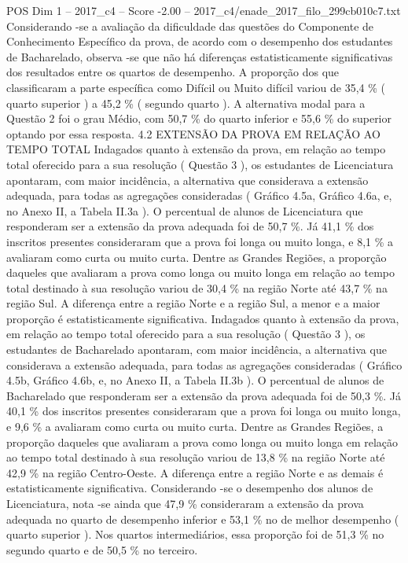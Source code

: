 \begin{textsample}{POS Dim 1 – 2017\_c4 – Score -2.00 – 2017\_c4/enade\_2017\_filo\_299cb010c7.txt}
Considerando -se a avaliação da dificuldade das questões do Componente de Conhecimento Específico da prova, de acordo com o desempenho dos estudantes de Bacharelado, observa -se que não há diferenças estatisticamente significativas dos resultados entre os quartos de desempenho.
A proporção dos que classificaram a parte específica como Difícil ou Muito difícil variou de 35,4 \% ( quarto superior ) a 45,2 \% ( segundo quarto ).
A alternativa modal para a Questão 2 foi o grau Médio, com 50,7 \% do quarto inferior e 55,6 \% do superior optando por essa resposta. 4.2 EXTENSÃO DA PROVA EM RELAÇÃO AO TEMPO TOTAL Indagados quanto à extensão da prova, em relação ao tempo total oferecido para a sua resolução ( Questão 3 ), os estudantes de Licenciatura apontaram, com maior incidência, a alternativa que considerava a extensão adequada, para todas as agregações consideradas ( Gráfico 4.5a, Gráfico 4.6a, e, no Anexo II, a Tabela II.3a ).
O percentual de alunos de Licenciatura que responderam ser a extensão da prova adequada foi de 50,7 \%.
Já 41,1 \% dos inscritos presentes consideraram que a prova foi longa ou muito longa, e 8,1 \% a avaliaram como curta ou muito curta.
Dentre as Grandes Regiões, a proporção daqueles que avaliaram a prova como longa ou muito longa em relação ao tempo total destinado à sua resolução variou de 30,4 \% na região Norte até 43,7 \% na região Sul.
A diferença entre a região Norte e a região Sul, a menor e a maior proporção é estatisticamente significativa.
Indagados quanto à extensão da prova, em relação ao tempo total oferecido para a sua resolução ( Questão 3 ), os estudantes de Bacharelado apontaram, com maior incidência, a alternativa que considerava a extensão adequada, para todas as agregações consideradas ( Gráfico 4.5b, Gráfico 4.6b, e, no Anexo II, a Tabela II.3b ).
O percentual de alunos de Bacharelado que responderam ser a extensão da prova adequada foi de 50,3 \%.
Já 40,1 \% dos inscritos presentes consideraram que a prova foi longa ou muito longa, e 9,6 \% a avaliaram como curta ou muito curta.
Dentre as Grandes Regiões, a proporção daqueles que avaliaram a prova como longa ou muito longa em relação ao tempo total destinado à sua resolução variou de 13,8 \% na região Norte até 42,9 \% na região Centro-Oeste.
A diferença entre a região Norte e as demais é estatisticamente significativa.
Considerando -se o desempenho dos alunos de Licenciatura, nota -se ainda que 47,9 \% consideraram a extensão da prova adequada no quarto de desempenho inferior e 53,1 \% no de melhor desempenho ( quarto superior ).
Nos quartos intermediários, essa proporção foi de 51,3 \% no segundo quarto e de 50,5 \% no terceiro.

\end{textsample}
